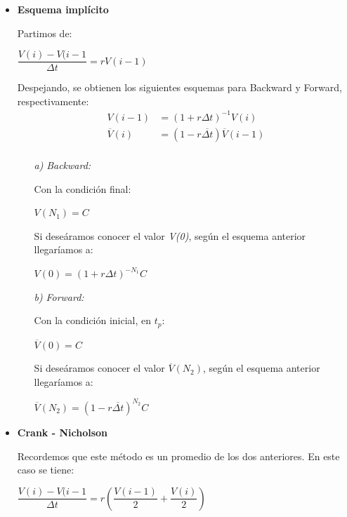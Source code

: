 \documentclass[titlepage, 10pt,]{article}
\begin{document}
{\begin{itemize}
	\item \textbf{Esquema implícito}

	\vspace{5pt}
	Partimos de:
		\begin{center}
			$\dfrac{V(i) - V(i-1}{\Delta t} = r V(i-1)$
		\end{center}
	
	Despejando, se obtienen los siguientes esquemas para Backward y Forward, respectivamente:
		\begin{align*}
			V(i - 1) &= (1 + r \Delta t)^{-1}V(i) \\
			\overline{V}(i) &= (1 - r \overline{\Delta t}) \overline{V}(i - 1) \\
		\end{align*}
		
		\begin{itemize}
			\item[\textit{a)}] \textit{Backward:}
			
			\vspace{5pt}
			Con la condición final:
				\begin{center}
					$V(N_{1}) = C$
				\end{center}
			Si deseáramos conocer el valor \textit{V(0)}, según el esquema anterior llegaríamos a:
				\begin{center}
					$V(0) = (1 + r \Delta t)^{-N_{1}} C$
				\end{center}
			
			\item[\textit{b)}] \textit{Forward:}
			
			\vspace{5pt}
			Con la condición inicial, en $t_{p}$:
				\begin{center}
					$\overline{V}(0) = C$
				\end{center}
			Si deseáramos conocer el valor $\overline{V}(N_{2})$, según el esquema anterior llegaríamos a:
				\begin{center}
					$\overline{V}(N_{2}) = (1 - r \overline{\Delta t})^{N_{2}} C$
				\end{center}
		\end{itemize}
	
	\item \textbf{Crank - Nicholson}

	\vspace{5pt}
	Recordemos que este método es un promedio de los dos anteriores. En este caso se tiene:
	
		\begin{center}
			$\dfrac{V(i) - V(i-1}{\Delta t} = r \left(\dfrac{V(i-1)}{2} + \dfrac{V(i)}{2} \right)$
		\end{center}
	

\end{itemize}}
\end{document}
